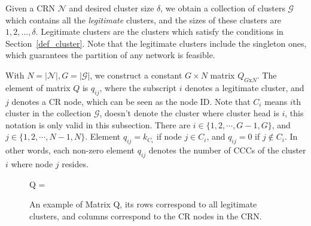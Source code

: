 \documentclass[10pt,journal,compsoc]{IEEEtran}
\theoremstyle{mytheoremstyle}
\theoremstyle{mytheoremstyle}
\theoremstyle{mytheoremstyle}
\newcommand{\bigO}{\ensuremath{\mathcal{O}}}%
\begin{document}




Given a CRN $\mathcal{N}$ and desired cluster size $\delta$, we obtain a collection of clusters $\mathcal{G}$ which contains all the \textit{legitimate} clusters, and the sizes of these clusters are $1,2,\ldots,\delta$.
Legitimate clusters are the clusters which satisfy the conditions in Section~\ref{def_cluster}. 
Note that the legitimate clusters include the singleton ones, which guarantees the partition of any network is feasible.

With $N=|\mathcal{N}|, G=|\mathcal{G}|$, we construct a constant $G\times N$ matrix $Q_{G\text{x}N}$. 
The element of matrix $Q$ is $q_{ij}$, where the subscript $i$ denotes a legitimate cluster, and $j$ denotes a CR node, which can be seen as the node ID. 
Note that $C_i$ means $i$th cluster in the collection $\mathcal{G}$, doesn't denote the cluster where cluster head is $i$, this notation is only valid in this subsection.
There are $i\in \{1,2,\cdots,G-1, G\}$, and $j\in \{1,2,\cdots,N-1, N\}$.
Element $q_{ij}= k_{C_i}$ if node $j\in C_i$, and $q_{ij}= 0$ if $j\notin C_i$.
In other words, each non-zero element $q_{ij}$ denotes the number of CCCs of the cluster $i$ where node $j$ resides.

\begin{figure}[ht!]
\centering
Q = 	
\caption{An example of Matrix Q, its rows correspond to all legitimate clusters, and columns correspond to the CR nodes in the CRN.}
\label{xx}
\end{figure}
\end{document}
